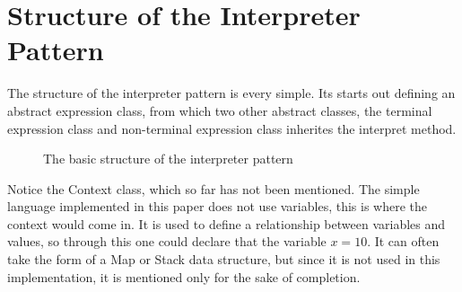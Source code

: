\section{Structure of the Interpreter Pattern}

The structure of the interpreter pattern is every simple.
Its starts out defining an abstract expression class, from which
two other abstract classes, the terminal expression class and non-terminal
expression class inherites the interpret method.

\begin{figure}[h]
  \centering
  \caption{The basic structure of the interpreter pattern}%
  \label{fig:basic_interpreter_structure}
\end{figure}

\noindent Notice the Context class, which so far has not been mentioned. The simple
language implemented in this paper does not use variables, this is 
where the context would come in. It is used to define a relationship between
variables and values, so through this one could declare that the variable
$ x = 10 $. It can often take the form of a Map or Stack data structure, but
since it is not used in this implementation, it is mentioned only for the sake
of completion.
